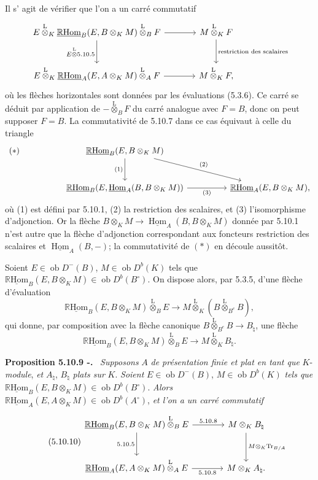 \documentclass[11pt]{article}
\newenvironment{statement}[1]{\par\medskip\noindent\textbf{#1.}\ }{\par\medskip}
\DeclareMathOperator{\Hom}{Hom}
\newcommand{\R}{\mathbb{R}}\newcommand{\RHomCore}{\mathbb{R}\mathrm{Hom}}
\newcommand{\ob}{\operatorname{ob}}
\providecommand{\RHom}{\RHomCore}
\providecommand{\uRHom}{\underline{\RHom}}
\providecommand{\uHom}{\underline{\Hom}}
\providecommand{\Tr}{\operatorname{Tr}}
\providecommand{\Tr}{\operatorname{Tr}}
\providecommand{\lten}{\overset{\mathrm L}{\otimes}}
\providecommand{\Tr}{\operatorname{Tr}}
\providecommand{\RHom}{\RHomCore}
\providecommand{\Hom}{\operatorname{Hom}}
\providecommand{\ob}{\operatorname{ob}}
\providecommand{\lten}{\overset{\mathrm L}{\otimes}}
\providecommand{\RHom}{\R\mathcal{H}om}
\providecommand{\lten}{\overset{\mathrm L}{\otimes}}
\providecommand{\R}{\mathrm R}
\providecommand{\Tr}{\operatorname{Tr}}
\providecommand{\lten}{\overset{\mathrm L}{\otimes}}
\providecommand{\lten}{\overset{\mathrm L}{\otimes}}
\providecommand{\lten}{\overset{\mathrm L}{\otimes}}
\providecommand{\RHom}{\RHomCore}
\providecommand{\Hom}{\operatorname{Hom}}
\providecommand{\Tr}{\operatorname{Tr}}
\providecommand{\lten}{\overset{\mathrm L}{\otimes}}
\begin{document}
Il s'%
agit de vérifier que l'on a un carré commutatif
\[
\begin{tikzcd}[column sep=large,row sep=large]
E\lten_K\uRHom_B(E,B\otimes_KM)\lten_BF \arrow[r] \arrow[d,"E\lten 5.10.5"'] & M\lten_KF \arrow[d,"\text{restriction des scalaires}"]\\
E\lten_K\uRHom_A(E,A\otimes_KM)\lten_AF \arrow[r] & M\lten_KF,
\end{tikzcd}
\]
où les flèches horizontales sont données par les évaluations (5.3.6). Ce carré se déduit par application de $-\lten_BF$ du carré analogue avec $F=B$, donc on peut supposer $F=B$. La commutativité de 5.10.7 dans ce cas équivaut à celle du triangle
\[
\begin{tikzcd}[column sep=huge,row sep=large]
|[alias=star]| {(*)} & \uRHom_B(E,B\otimes_KM) \arrow[d,"(1)"'] \arrow[dr,"(2)"] & \\
& \uRHom_B(E,\uHom_A(B,B\otimes_KM)) \arrow[r,"(3)"'] & \uRHom_A(E,B\otimes_KM),
\end{tikzcd}
\]
où (1) est défini par 5.10.1, (2) la restriction des scalaires, et (3) l'isomorphisme d'adjonction. Or la flèche $B\otimes_KM\to\uHom_A(B,B\otimes_KM)$ donnée par 5.10.1 n'est autre que la flèche d'adjonction correspondant aux foncteurs restriction des scalaires et $\uHom_A(B,-)$; la commutativité de $(*)$ en découle aussitôt.

Soient $E\in\ob D^-(B)$, $M\in\ob D^b(K)$ tels que $\uRHom_B(E,B\otimes_KM)\in\ob D^b(B^\circ)$. On dispose alors, par 5.3.5, d'une flèche d'évaluation
\[
\uRHom_B(E,B\otimes_KM)\lten_BE\longrightarrow M\lten_K(B\lten_{B^e}B),
\]
qui donne, par composition avec la flèche canonique $B\lten_{B^e}B\to B_\natural$, une flèche
\begin{equation}\tag{5.10.8}
\uRHom_B(E,B\otimes_KM)\lten_BE\longrightarrow M\lten_KB_\natural.
\end{equation}

\begin{statement}{Proposition 5.10.9 -}
\emph{Supposons} $A$ \emph{de présentation finie et plat en tant que} $K$-\emph{module}, \emph{et} $A_\natural$, $B_\natural$ \emph{plats sur} $K$. \emph{Soient} $E\in\ob D^-(B)$, $M\in\ob D^b(K)$ \emph{tels que} $\uRHom_B(E,B\otimes_KM)\in\ob D^b(B^\circ)$. \emph{Alors} $\uRHom_A(E,A\otimes_KM)\in\ob D^b(A^\circ)$, \emph{et l'on a un carré commutatif}
\begin{equation}\tag{5.10.10}
\begin{tikzcd}[column sep=large,row sep=large]
\uRHom_B(E,B\otimes_KM)\lten_BE \arrow[r,"5.10.8"] \arrow[d,"5.10.5"'] & M\otimes_KB_\natural \arrow[d,"M\otimes_K\Tr_{B/A}"]\\
\uRHom_A(E,A\otimes_KM)\lten_AE \arrow[r,"5.10.8"'] & M\otimes_KA_\natural .
\end{tikzcd}
\end{equation}
\end{statement}
\end{document}
